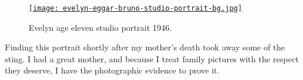 
\begin{figure}[htbp]
\centering
\hypertarget{ht:4048X5}{}
\href{http://conceptcontrol.smugmug.com/People/From-Hazels-Albums-1/7104752\_FZK4j4\#!i=2521568625\&k=86Sn8rs\&lb=1\&s=A}{\texttt{[image: evelyn-eggar-bruno-studio-portrait-bg.jpg]}}
\caption{Evelyn age eleven studio portrait 1946.}
\label{fig:4048X5}
\end{figure}

Finding this portrait shortly after my mother's death took away some of
the sting. I had a great mother, and because I treat family pictures
with the respect they deserve, I have the photographic evidence to prove
it.





